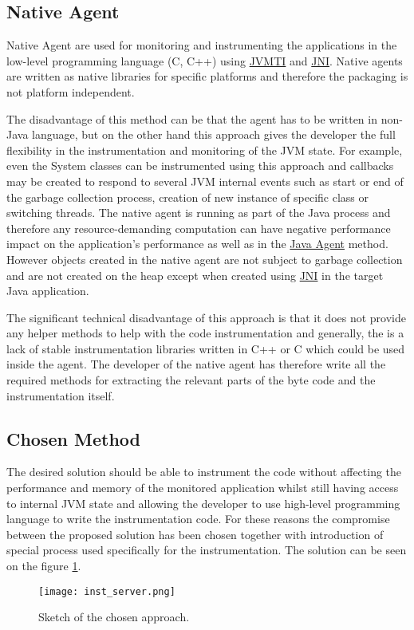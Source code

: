 \subsection{Native Agent}
Native Agent are used for monitoring and instrumenting the applications in the low-level programming language (C, C++) using \hyperref[JVMTI]{JVMTI} and \hyperref[JNI]{JNI}. Native agents are written as native libraries for specific platforms and therefore the packaging is not platform independent. 

The disadvantage of this method can be that the agent has to be written in non-Java language, but on the other hand this approach gives the developer the full flexibility in the instrumentation and monitoring of the JVM state. For example, even the System classes can be instrumented using this approach and callbacks may be created to respond to several JVM internal events such as start or end of the garbage collection process, creation of new instance of specific class or switching threads. The native agent is running as part of the Java process and therefore any resource-demanding computation can have negative performance impact on the application's performance as well as in the \hyperref[java_agent]{Java Agent} method. However objects created in the native agent are not subject to garbage collection and are not created on the heap except when created using \hyperref[JNI]{JNI} in the target Java application.

The significant technical disadvantage of this approach is that it does not provide any helper methods to help with the code instrumentation and generally, the is a lack of stable instrumentation libraries written in C++ or C which could be used inside the agent. The developer of the native agent has therefore write all the required methods for extracting the relevant parts of the byte code and the instrumentation itself.
\subsection{Chosen Method}
\label{subsec:inst_jvm}
The desired solution should be able to instrument the code without affecting the performance and memory of the monitored application whilst still having access to internal JVM state and allowing the developer to use high-level programming language to write the instrumentation code. For these reasons the compromise between the proposed solution has been chosen together with introduction of special process used specifically for the instrumentation. The solution can be seen on the figure \ref{fig:inst_server_basic}.
\begin{figure}
	\centering
	\texttt{[image: inst\_server.png]}
	\caption{Sketch of the chosen approach.}
	\label{fig:inst_server_basic}
\end{figure}

